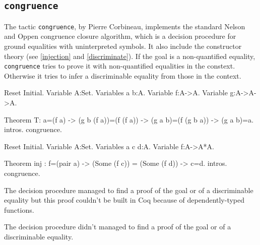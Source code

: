 
\subsection{\tt congruence}
\label{congruence}

The tactic {\tt congruence}, by Pierre Corbineau, implements the standard Nelson and Oppen
congruence closure algorithm, which is a decision procedure for ground
equalities with uninterpreted symbols. It also include the constructor theory
(see \ref{injection} and \ref{discriminate}).
If the goal is a non-quantified equality, {\tt congruence} tries to
prove it with non-quantified equalities in the constext. Otherwise it
tries to infer a discriminable equality from those in the context.

\begin{coq_eval}
Reset Initial.
Variable A:Set.
Variables a b:A.
Variable f:A->A.
Variable g:A->A->A.
\end{coq_eval}

\begin{coq_example}
Theorem T: a=(f a) -> (g b (f a))=(f (f a)) -> (g a b)=(f (g b a)) -> (g a b)=a.
intros.
congruence.
\end{coq_example}

\begin{coq_eval}
Reset Initial.
Variable A:Set.
Variables a c d:A.
Variable f:A->A*A.
\end{coq_eval}

\begin{coq_example}
Theorem inj : f=(pair a) -> (Some (f c)) = (Some (f d)) -> c=d.
intros.
congruence.
\end{coq_example}

\begin{ErrMsgs}
  \item {}
    The decision procedure managed to find a proof of the goal or of
    a discriminable equality but this proof couldn't be built in Coq
    because of dependently-typed functions.
  \item {}
    The decision procedure didn't managed to find a proof of the goal or of
    a discriminable equality.
\end{ErrMsgs}

